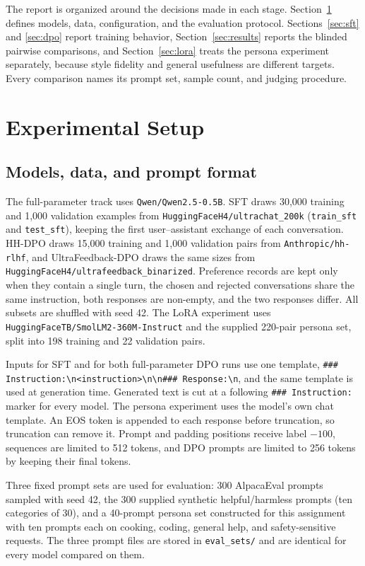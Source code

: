 \documentclass{article}
\newcommand{\code}[1]{\texttt{#1}}
\begin{document}
The report is organized around the decisions made in each stage. Section~\ref{sec:setup} defines models, data, configuration, and the evaluation protocol. Sections~\ref{sec:sft} and \ref{sec:dpo} report training behavior, Section~\ref{sec:results} reports the blinded pairwise comparisons, and Section~\ref{sec:lora} treats the persona experiment separately, because style fidelity and general usefulness are different targets. Every comparison names its prompt set, sample count, and judging procedure.

\section{Experimental Setup}
\label{sec:setup}

\subsection{Models, data, and prompt format}

The full-parameter track uses \code{Qwen/Qwen2.5-0.5B}. SFT draws 30,000 training and 1,000 validation examples from \code{HuggingFaceH4/ultrachat\_200k} (\code{train\_sft} and \code{test\_sft}), keeping the first user--assistant exchange of each conversation. HH-DPO draws 15,000 training and 1,000 validation pairs from \code{Anthropic/hh-rlhf}, and UltraFeedback-DPO draws the same sizes from \code{HuggingFaceH4/ultrafeedback\_binarized}. Preference records are kept only when they contain a single turn, the chosen and rejected conversations share the same instruction, both responses are non-empty, and the two responses differ. All subsets are shuffled with seed 42. The LoRA experiment uses \code{HuggingFaceTB/SmolLM2-360M-Instruct} and the supplied 220-pair persona set, split into 198 training and 22 validation pairs.

Inputs for SFT and for both full-parameter DPO runs use one template, \code{\#\#\# Instruction:\textbackslash n<instruction>\textbackslash n\textbackslash n\#\#\# Response:\textbackslash n}, and the same template is used at generation time. Generated text is cut at a following \code{\#\#\# Instruction:} marker for every model. The persona experiment uses the model's own chat template. An EOS token is appended to each response before truncation, so truncation can remove it. Prompt and padding positions receive label $-100$, sequences are limited to 512 tokens, and DPO prompts are limited to 256 tokens by keeping their final tokens.

Three fixed prompt sets are used for evaluation: 300 AlpacaEval prompts sampled with seed 42, the 300 supplied synthetic helpful/harmless prompts (ten categories of 30), and a 40-prompt persona set constructed for this assignment with ten prompts each on cooking, coding, general help, and safety-sensitive requests. The three prompt files are stored in \code{eval\_sets/} and are identical for every model compared on them.
\end{document}
